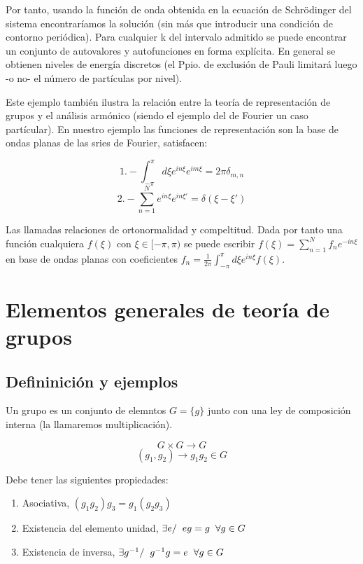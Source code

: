 \documentclass{article}
\begin{document}
Por tanto, usando la función de onda obtenida en la ecuación de Schrödinger del sistema encontraríamos la solución (sin más que introducir una condición de contorno periódica). Para cualquier k del intervalo admitido se puede encontrar un conjunto de autovalores y autofunciones en forma explícita. En general se obtienen niveles de energía discretos (el Ppio. de exclusión de Pauli limitará luego -o no- el número de partículas por nivel).

\smallskip
Este ejemplo también ilustra la relación entre la teoría de representación de grupos y el análisis armónico (siendo el ejemplo del de Fourier un caso partícular). En nuestro ejemplo las funciones de representación son la base de ondas planas de las sries de Fourier, satisfacen:

$$1.- \int ^\pi _{-\pi} d\xi e^{in\xi} e^{im\xi} =2\pi \delta _{m,n}$$
$$2.- \sum _{n=1}^N e^{in\xi}e^{in\xi '}=\delta (\xi-\xi ')$$

Las llamadas relaciones de ortonormalidad y compeltitud. Dada por tanto una función cualquiera $f(\xi)$ con $\xi \in [-\pi,\pi)$ se puede escribir $f(\xi)=\sum _{n=1}^N f_ne^{-in\xi}$ en base de ondas planas con coeficientes $f_n=\frac{1}{2\pi}\int^\pi _{-\pi}d\xi e^{in\xi}f(\xi)$.

\newpage

%
%
%
%
%
%
%
%
%
%
%
%
%
%
%
%

\section{Elementos generales de teoría de grupos}
\subsection{Defininición y ejemplos}
Un grupo es un conjunto de elemntos $G=\lbrace g\rbrace$ junto con una ley de composición interna (la llamaremos multiplicación).

$$G\times G\rightarrow G$$
$$(g_1,g_2)\rightarrow g_1g_2 \in G$$

Debe tener las siguientes propiedades:

\begin{enumerate}
\item Asociativa, $ (g_1g_2)g_3=g_1(g_2g_3)$
\item Existencia del elemento unidad, $\exists e / \hspace{0.2cm} eg=g\hspace{0.2cm} \forall g\in G$
\item Existencia de inversa, $\exists g^{-1} / \hspace{0.2cm} g^{-1}g=e \hspace{0.2cm} \forall g\in G$
\end{enumerate}
\end{document}
